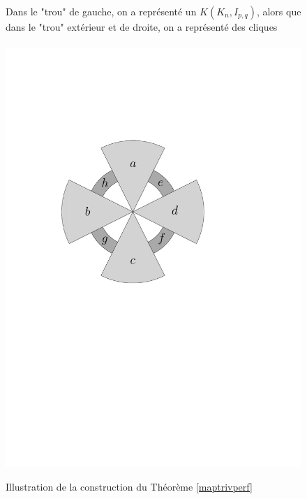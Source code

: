 \documentclass{scrartcl}
\begin{document}
\begin{flushleft}
\begin{figure}[h]
    \caption{Illustration de la construction du Théorème \ref{maptrivperf}}
    \begin{center}
        Dans le "trou" de gauche, on a représenté un $K(K_n, I_{p,q})$, alors que dans le "trou" extérieur et de droite,
        on a représenté des cliques
        \\~\\
        \includegraphics[page=\ipeFigcartetrivperf, scale = 0.6]{figs}
    \end{center}
\end{figure}


\end{flushleft}
\end{document}
